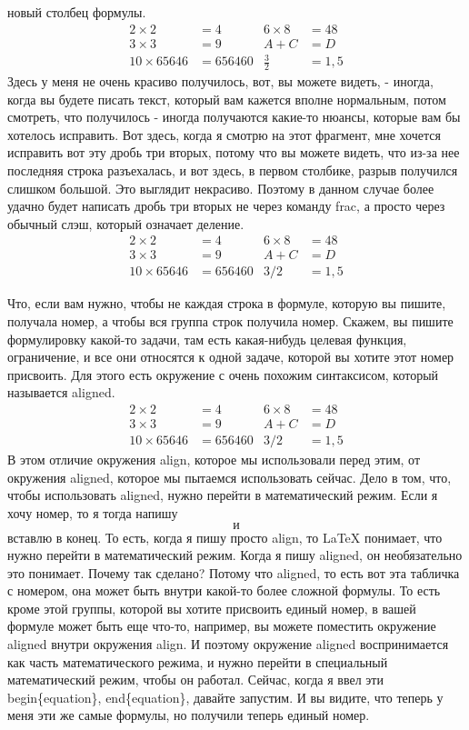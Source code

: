 \documentclass[a4paper,12pt]{article} %
\begin{document}
{новый столбец формулы.
\begin{align}
2\times 2&=4 & 6\times 8 &=48\\
3\times 3&=9 & A+C&=D\\
10\times 65646 &= 656460 & \frac{3}{2}&=1,5
\end{align}
Здесь у меня не очень красиво получилось,
вот, вы можете видеть, - иногда, когда вы будете писать текст, который вам кажется вполне нормальным, потом смотреть,
что получилось - иногда получаются какие-то нюансы,
которые вам бы хотелось исправить. Вот здесь, когда я смотрю на этот фрагмент,
мне хочется исправить вот эту дробь три
вторых, потому что вы можете видеть, что из-за нее последняя
строка разъехалась, и вот здесь, в первом столбике, разрыв
получился слишком большой. Это выглядит некрасиво. Поэтому в данном случае более удачно
будет написать дробь три вторых не через команду frac, а просто через
обычный слэш, который означает деление. 
\begin{align}
2\times 2&=4 & 6\times 8 &=48\\
3\times 3&=9 & A+C&=D\\
10\times 65646 &= 656460 & 3/2&=1,5
\end{align}

Что, если вам нужно, чтобы не каждая строка
в формуле, которую вы пишите, получала номер, а чтобы
вся группа строк получила номер. Скажем, вы пишите формулировку какой-то
задачи, там есть какая-нибудь целевая функция,
ограничение, и все они относятся к одной задаче,
которой вы хотите этот номер присвоить. Для этого есть окружение с очень похожим синтаксисом, который
называется aligned.
\begin{equation}
\begin{aligned}
2\times 2&=4 & 6\times 8 &=48\\
3\times 3&=9 & A+C&=D\\
10\times 65646 &= 656460 & 3/2&=1,5	
\end{aligned}
\end{equation}
В этом отличие окружения align, которое мы
использовали перед этим, от окружения aligned, которое мы пытаемся
использовать сейчас. Дело в том, что, чтобы использовать aligned, нужно перейти в математический
режим. Если я хочу номер, то я тогда напишу
\begin{equation} и \end{equation} вставлю в конец. То есть, когда я пишу просто align, то LaTeX понимает, что нужно перейти в
математический режим. Когда я пишу aligned, он необязательно это
понимает. Почему так сделано? Потому что aligned, то есть вот эта табличка с
номером, она может быть внутри какой-то более
сложной формулы. То есть кроме этой группы, которой
вы хотите присвоить единый номер, в вашей формуле может быть еще что-то, например,
вы можете поместить окружение aligned внутри
окружения align. И поэтому окружение aligned
воспринимается как часть математического режима, и нужно перейти в специальный математический
режим, чтобы он работал. Сейчас, когда я ввел эти begin\{equation\},
end\{equation\}, давайте запустим. И вы видите, что теперь у меня эти же самые формулы, но получили теперь
единый номер.
}
\end{document}

